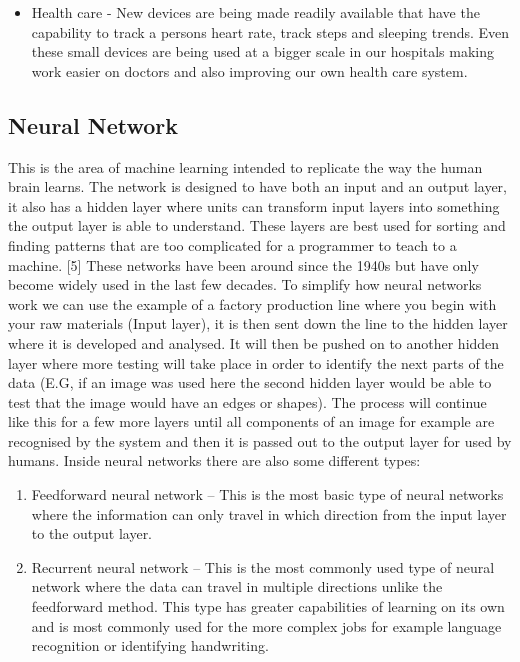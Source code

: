 \documentclass[letterpaper, 10 pt, conference]{ieeeconf}  %
\begin{document}
\begin{itemize}
\item Health care - New devices are being made readily available that have the capability  to track a persons heart rate, track steps and sleeping trends. Even these small devices are being used at a bigger scale in our hospitals making work easier on doctors and also improving our own health care system.
\end{itemize}

\subsection{Neural Network}
This is the area of machine learning intended to replicate the way the human brain learns. The network is designed to have both an input and an output layer, it also has a hidden layer where units can transform input layers into something the output layer is able to understand. These layers are best used for sorting and finding patterns that are too complicated for a programmer to teach to a machine. [5] These networks have been around since the 1940s but have only become widely used in the last few decades. To simplify how neural networks work we can use the example of a factory production line where you begin with your raw materials (Input layer), it is then sent down the line to the hidden layer where it is developed and analysed. It will then be pushed on to another hidden layer where more testing will take place in order to identify the next parts of the data (E.G, if an image was used here the second hidden layer would be able to test that the image would have an edges or shapes). The process will continue like this for a few more layers until all components of an image for example are recognised by the system and then it is passed out to the output layer for used by humans. 
Inside neural networks there are also some different types:

\begin{enumerate}
\item 
Feedforward neural network – This is the most basic type of neural networks where the information can only travel in which direction from the input layer to the output layer.
\item 
Recurrent neural network – This is the most commonly used type of neural network where the data can travel in multiple directions unlike the feedforward method. This type has greater capabilities of learning on its own and is most commonly used for the more complex jobs for example language recognition or identifying handwriting. 
\end{enumerate}
\end{document}
